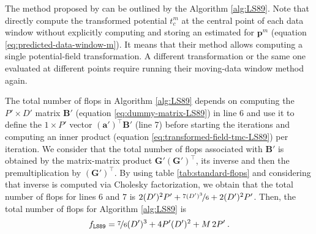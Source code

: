 \documentclass[utf8]{FrontiersinHarvard} %
\begin{document}
	The method proposed by \cite{leao-silva1989} can be outlined by the Algorithm \ref{alg:LS89}.
	Note that \cite{leao-silva1989} directly compute the transformed potential $t^{m}_{c}$ at the central point of
	each data window without explicitly computing and storing an estimated for $\mathbf{p}^{m}$ (equation \ref{eq:predicted-data-window-m}).
	It means that their method allows computing a single potential-field transformation. 
	A different transformation or the same one evaluated at different points require running their moving-data window method again.
	
	The total number of flops in Algorithm \ref{alg:LS89} depends on computing the $P' \times D'$
	matrix $\mathbf{B}'$ (equation \ref{eq:dummy-matrix-LS89}) in line 6 and use it to define
	the $1 \times P'$ vector $\left(\mathbf{a}' \right)^{\top} \mathbf{B}'$ (line 7) before 
	starting the iterations and computing an inner product (equation \ref{eq:transformed-field-tmc-LS89}) per iteration.
	We consider that the total number of flops associated with $\mathbf{B}'$ is obtained by 
	the matrix-matrix product $\mathbf{G}' \left(\mathbf{G}'\right)^{\top}$, its inverse
	and then the premultiplication by $\left(\mathbf{G}'\right)^{\top}$.
	By using table \ref{tab:standard-flops} and considering that inverse is computed via Cholesky factorization, we obtain that the total number of flops for lines $6$ and $7$ is
	$2(D')^{2}P' + \nicefrac{7 (D')^{3}}{6} + 2(D')^{2}P'$.
	Then, the total number of flops for Algorithm \ref{alg:LS89} is
	\begin{equation}
		f_{\mathtt{LS89}} = \nicefrac{7}{6}(D')^{3} + 4P'(D')^{2} + M \, 2 P' \: .
		\label{flops:LS89}
	\end{equation}
	
\end{document}
